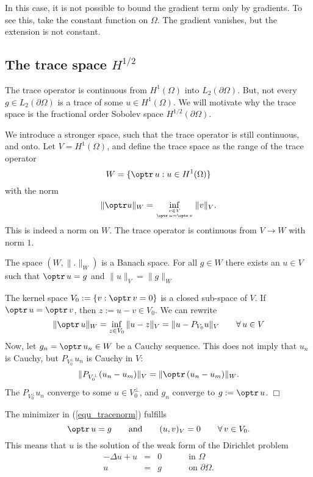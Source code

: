In this case, it is not possible to bound the gradient term only by gradients.
To see this, take the constant function on $\Omega$. The gradient vanishes,
but the extension is not constant.


\subsection{The trace space $H^{1/2}$ }
\label{sec_traceh1}
%
The trace operator is continuous from $H^1(\Omega)$ into $L_2(\partial \Omega)$. But, not every $g \in L_2(\partial \Omega)$ is a trace of some $u \in H^1(\Omega)$. We will motivate why the trace space is the fractional order Sobolev 
space $H^{1/2}(\partial \Omega)$.

We introduce a stronger space, such that the trace operator is still
continuous, and onto. 
Let $V = H^1(\Omega)$, and define the trace space as the range of the 
trace operator
$$
W = \{ \optr \, u : u \in H^1(\Omega) \}
$$
with the norm
\begin{equation}
\label{equ_tracenorm}
\| \optr u \|_W = \inf_{v \in V \atop \optr \, u = \optr \, v } \| v \|_V.
\end{equation}
This is indeed a norm on $W$. The trace operator is continuous from $V \rightarrow W$ with norm $1$. 

\begin{lemma} The space $(W, \|.\|_W)$ is a Banach space. For all $g \in W$
there exists an $u \in V$ such that $\optr \, u = g$ and $\| u \|_V = \| g \|_W$
\end{lemma}
The kernel space $V_0 := \{ v : \optr \, v = 0 \}$ is a closed sub-space of 
$V$. If $\optr \, u = \optr \, v$, then $z := u - v \in V_0$. We can rewrite
$$
\| \optr \, u \|_W = \inf_{z \in V_0} \| u - z \|_V = \| u - P_{V_0} u \|_V
\qquad  \forall \, u \in V
$$
Now, let $g_n = \optr \, u_n \in W$ be a Cauchy sequence. This does not
imply that $u_n$ is Cauchy, but $P_{V_0^\bot} u_n$ is 
Cauchy in $V$:
$$
\| P_{V_0^\bot} (u_n - u_m) \|_V = \| \optr \, (u_n - u_m) \|_W.
$$
The $P_{V_0^\bot} u_n$ converge to some $u \in V_0^\bot$, and $g_n$ converge
to $g := \optr \, u$. 
\hfill $\Box$


The minimizer in (\ref{equ_tracenorm}) fulfills
$$
\optr \, u = g \qquad \mbox{and} \qquad (u,v)_V = 0 \qquad \forall \, v \in V_0.
$$
This means that $u$ is the solution of the weak form of the
Dirichlet problem 
$$
\begin{array}{rcll}
-\Delta u + u & = & 0 \qquad & \mbox{ in }  \Omega \\
u & = & g \qquad & \mbox{ on } \partial \Omega.
\end{array}
$$


